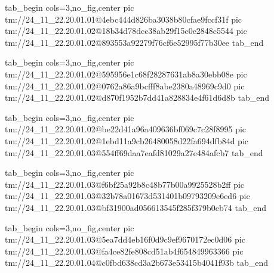  
 
 
 
 

\qqSecCmtScr


\ifcmt
  tab_begin cols=3,no_fig,center
    pic tm://24_11_22.20.01.01@4ebc444d826ba3038b80cfae9fccf31f
    pic tm://24_11_22.20.01.02@18b34d78dcc38ab29f15c0e2848c5544
    pic tm://24_11_22.20.01.02@893553a92279f76cf6e52995f77b30ee
  tab_end
\fi


\ifcmt
  tab_begin cols=3,no_fig,center
    pic tm://24_11_22.20.01.02@595956e1c68f28287631ab8a30ebb08e
    pic tm://24_11_22.20.01.02@0762a86a9bcfff8abe2380a48969c9d0
    pic tm://24_11_22.20.01.02@d870f1952b7dd41a828834e4f61d6d8b
  tab_end
\fi


\ifcmt
  tab_begin cols=3,no_fig,center
    pic tm://24_11_22.20.01.02@be22d41a96a409636bf069c7c28f8995
    pic tm://24_11_22.20.01.02@1ebd11a9cb26480058d22fa694dfb84d
    pic tm://24_11_22.20.01.03@554ff69daa7eafd81029a27e484afcb7
  tab_end
\fi


\ifcmt
  tab_begin cols=3,no_fig,center
    pic tm://24_11_22.20.01.03@f6bf25a92b8c48b77b00a9925528b2ff
    pic tm://24_11_22.20.01.03@32b78a01673d531401b09793209e6ed6
    pic tm://24_11_22.20.01.03@bf31900ad056613545f285f379b0cb74
  tab_end
\fi


\ifcmt
  tab_begin cols=3,no_fig,center
    pic tm://24_11_22.20.01.03@5ea7dd4eb16f0d9c9ef9670172ec0d06
    pic tm://24_11_22.20.01.03@fa4ce82fe808cd51ab4f654849963366
    pic tm://24_11_22.20.01.04@c0fbd638cd3a2b673e53415b4041f93b
  tab_end
\fi


